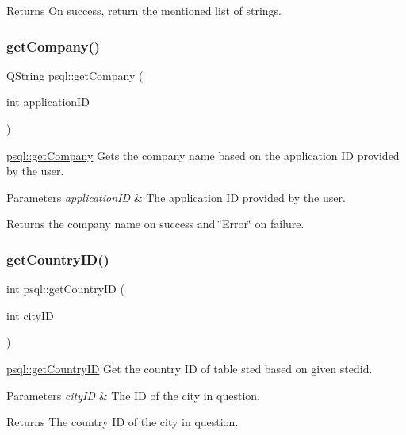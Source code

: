 \begin{DoxyReturn}{Returns}
On success, return the mentioned list of strings. 
\end{DoxyReturn}
\mbox{\label{classpsql_a09745cd03f09ffb2dacacaab4281915f}} 
\subsubsection{\texorpdfstring{get\+Company()}{getCompany()}}
{\footnotesize\ttfamily Q\+String psql\+::get\+Company (\begin{DoxyParamCaption}\item[{int}]{application\+ID }\end{DoxyParamCaption})}



\hyperlink{classpsql_a09745cd03f09ffb2dacacaab4281915f}{psql\+::get\+Company} Gets the company name based on the application ID provided by the user. 


\begin{DoxyParams}{Parameters}
{\em application\+ID} & The application ID provided by the user. \\
\hline
\end{DoxyParams}
\begin{DoxyReturn}{Returns}
the company name on success and \char`\"{}\+Error\char`\"{} on failure. 
\end{DoxyReturn}
\mbox{\label{classpsql_a81d02dc0350ba11d90257914078ba432}} 
\subsubsection{\texorpdfstring{get\+Country\+I\+D()}{getCountryID()}}
{\footnotesize\ttfamily int psql\+::get\+Country\+ID (\begin{DoxyParamCaption}\item[{int}]{city\+ID }\end{DoxyParamCaption})}



\hyperlink{classpsql_a81d02dc0350ba11d90257914078ba432}{psql\+::get\+Country\+ID} Get the country ID of table sted based on given stedid. 


\begin{DoxyParams}{Parameters}
{\em city\+ID} & The ID of the city in question. \\
\hline
\end{DoxyParams}
\begin{DoxyReturn}{Returns}
The country ID of the city in question. 
\end{DoxyReturn}
\mbox{\label{classpsql_a5724e9992e6a5c98524ab73b98f4202d}} 
